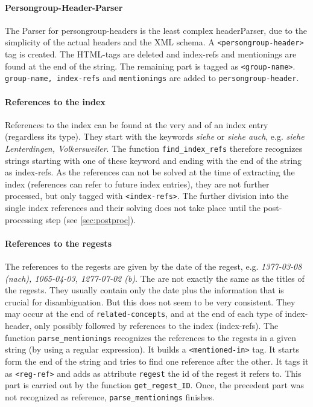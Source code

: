 \paragraph{Persongroup-Header-Parser}
The Parser for persongroup-headers is the least complex headerParser, due to the simplicity of the actual headers and the XML schema. A \texttt{<persongroup-header>} tag is created. The HTML-tags are deleted and index-refs and mentionings are found at the end of the string. The remaining part is tagged as \texttt{<group-name>}. \texttt{group-name, index-refs} and \texttt{mentionings} are added to \texttt{persongroup-header}.

\paragraph{References to the index}
\label{sec:index-refs}
References to the index can be found at the very and of an index entry (regardless its type). They start with the keywords \textit{siehe} or \textit{siehe auch}, e.g. \textit{siehe Lenterdingen, Volkersweiler}. The function \texttt{find\_index\_refs} therefore recognizes strings starting with one of these keyword and ending with the end of the string as index-refs. As the references can not be solved at the time of extracting the index (references can refer to future index entries), they are not further processed, but only tagged with \texttt{<index-refs>}. The further division into the single index references and their solving does not take place until the post-processing step (see \ref{sec:postproc}).

\paragraph{References to the regests}
\label{sec:reg-refs}
The references to the regests are given by the date of the regest, e.g. \textit{1377-03-08 (nach), 1065-04-03, 1277-07-02 (b)}. The are not exactly the same as the titles of the regests. They usually contain only the date plus the information that is crucial for disambiguation. But this does not seem to be very consistent. They may occur at the end of \texttt{related-concepts}, and at the end of each type of index-header, only possibly followed by references to the index (index-refs).
The function \texttt{parse\_mentionings} recognizes the references to the regests in a given string (by using a regular expression). It builds a \texttt{<mentioned-in>} tag. It starts form the end of the string and tries to find one reference after the other. It tags it as \texttt{<reg-ref>} and adds as attribute \texttt{regest} the id of the regest it refers to. This part is carried out by the function \texttt{get\_regest\_ID}. Once, the precedent part was not recognized as reference, \texttt{parse\_mentionings} finishes.


